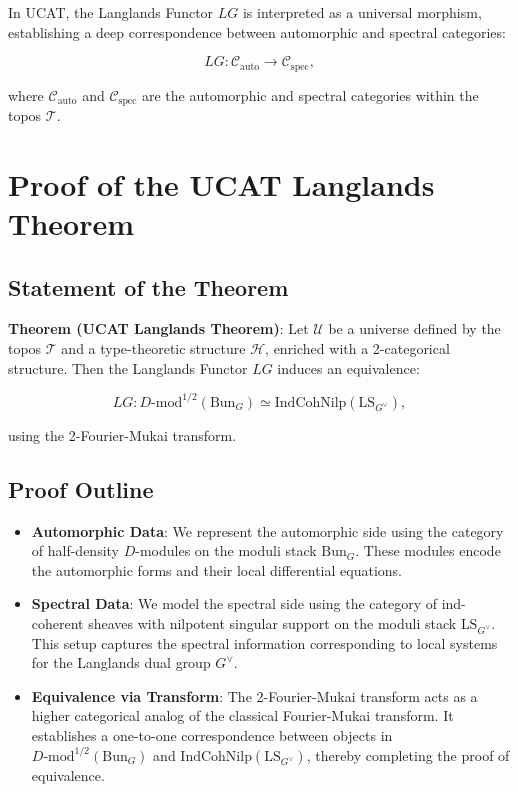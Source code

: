 \documentclass{article}
\begin{document}
In UCAT, the Langlands Functor \( LG \) is interpreted as a universal morphism, establishing a deep correspondence between automorphic and spectral categories:

\[
LG : \mathcal{C}_{\text{auto}} \longrightarrow \mathcal{C}_{\text{spec}},
\]

where \( \mathcal{C}_{\text{auto}} \) and \( \mathcal{C}_{\text{spec}} \) are the automorphic and spectral categories within the topos \( \mathcal{T} \).

\section{Proof of the UCAT Langlands Theorem}

\subsection{Statement of the Theorem}

\textbf{Theorem (UCAT Langlands Theorem)}:  
Let \( \mathcal{U} \) be a universe defined by the topos \( \mathcal{T} \) and a type-theoretic structure \( \mathcal{H} \), enriched with a 2-categorical structure. Then the Langlands Functor \( LG \) induces an equivalence:

\[
LG : D\text{-mod}^{1/2}(\text{Bun}_G) \simeq \text{IndCohNilp}(\text{LS}_{G^{\vee}}),
\]

using the 2-Fourier-Mukai transform.

\subsection{Proof Outline}

\begin{itemize}
    \item \textbf{Automorphic Data}: We represent the automorphic side using the category of half-density \( D \)-modules on the moduli stack \( \text{Bun}_G \). These modules encode the automorphic forms and their local differential equations.

    \item \textbf{Spectral Data}: We model the spectral side using the category of ind-coherent sheaves with nilpotent singular support on the moduli stack \( \text{LS}_{G^{\vee}} \). This setup captures the spectral information corresponding to local systems for the Langlands dual group \( G^{\vee} \).

    \item \textbf{Equivalence via Transform}: The 2-Fourier-Mukai transform acts as a higher categorical analog of the classical Fourier-Mukai transform. It establishes a one-to-one correspondence between objects in \( D\text{-mod}^{1/2}(\text{Bun}_G) \) and \( \text{IndCohNilp}(\text{LS}_{G^{\vee}}) \), thereby completing the proof of equivalence.
\end{itemize}
\end{document}
